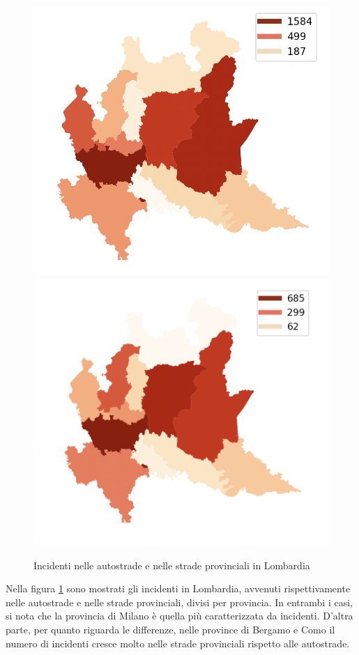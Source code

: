 \documentclass[a4paper]{report}
\begin{document}
\begin{figure}
    \includegraphics[width=0.5\linewidth]{../src/provincia/lombardia_autostrade.png}
    \includegraphics[width=0.5\linewidth]{../src/provincia/lombardia_strade_prov.png}
    \caption{Incidenti nelle autostrade e nelle strade provinciali in Lombardia}
    \label{fig:lombardia-strade}
\end{figure}

Nella figura \ref{fig:lombardia-strade} sono mostrati gli incidenti in Lombardia, 
avvenuti rispettivamente nelle autostrade e nelle strade provinciali, divisi per provincia.
In entrambi i casi, si nota che la provincia di Milano è quella più caratterizzata da incidenti. 
D'altra parte, per quanto riguarda le differenze, nelle province di Bergamo e Como il numero di 
incidenti cresce molto nelle strade provinciali rispetto alle autostrade.
\end{document}
